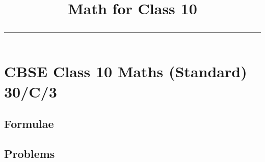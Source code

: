 \documentclass[10pt]{article}
\begin{document}
\onecolumn

\title{
	\begin{center}
	Math for Class 10
	\\
	\rule{0.4\columnwidth}{0.4pt}
	\end{center}
}
\author{}
\date{}
\maketitle

\tableofcontents
\newpage

\renewcommand{\thetable}{\theenumi}

\section{CBSE Class 10 Maths (Standard) 30/C/3}
\subsection{Formulae}
\label{pg:formulae}

\newpage
\subsection{Problems}
\label{pg:problems}

\label{pg:end}
\end{document}
